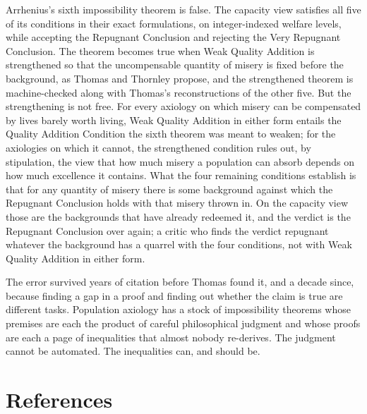 \documentclass[
  11pt,
  letterpaper,
  DIV=11,
  numbers=noendperiod,
  twoside]{scrartcl}
\begin{document}
Arrhenius's sixth impossibility theorem is false. The capacity view
satisfies all five of its conditions in their exact formulations, on
integer-indexed welfare levels, while accepting the Repugnant Conclusion
and rejecting the Very Repugnant Conclusion. The theorem becomes true
when Weak Quality Addition is strengthened so that the uncompensable
quantity of misery is fixed before the background, as Thomas and
Thornley propose, and the strengthened theorem is machine-checked along
with Thomas's reconstructions of the other five. But the strengthening
is not free. For every axiology on which misery can be compensated by
lives barely worth living, Weak Quality Addition in either form entails
the Quality Addition Condition the sixth theorem was meant to weaken;
for the axiologies on which it cannot, the strengthened condition rules
out, by stipulation, the view that how much misery a population can
absorb depends on how much excellence it contains. What the four
remaining conditions establish is that for any quantity of misery there
is some background against which the Repugnant Conclusion holds with
that misery thrown in. On the capacity view those are the backgrounds
that have already redeemed it, and the verdict is the Repugnant
Conclusion over again; a critic who finds the verdict repugnant whatever
the background has a quarrel with the four conditions, not with Weak
Quality Addition in either form.

The error survived years of citation before Thomas found it, and a
decade since, because finding a gap in a proof and finding out whether
the claim is true are different tasks. Population axiology has a stock
of impossibility theorems whose premises are each the product of careful
philosophical judgment and whose proofs are each a page of inequalities
that almost nobody re-derives. The judgment cannot be automated. The
inequalities can, and should be.

\section*{References}\label{references}
\end{document}
